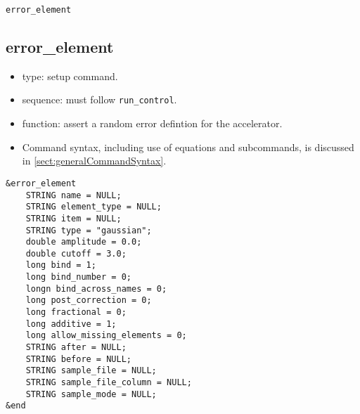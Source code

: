 \documentclass[11pt]{article}
\begin{document}
\newpage
\begin{center}{\Large\verb|error_element|}\end{center}
\subsection{error\_element \label{subsec:errorelement}}

\begin{itemize}
\item type: setup command.
\item sequence: must follow \verb|run_control|.
\item function: assert a random error defintion for the accelerator.
\item Command syntax, including use of equations and subcommands, is discussed in \ref{sect:generalCommandSyntax}.
\end{itemize}

\begin{verbatim}
&error_element
    STRING name = NULL;
    STRING element_type = NULL;
    STRING item = NULL;
    STRING type = "gaussian";
    double amplitude = 0.0;
    double cutoff = 3.0;
    long bind = 1;
    long bind_number = 0;
    longn bind_across_names = 0;
    long post_correction = 0;
    long fractional = 0;
    long additive = 1;
    long allow_missing_elements = 0;
    STRING after = NULL;
    STRING before = NULL;
    STRING sample_file = NULL;
    STRING sample_file_column = NULL;
    STRING sample_mode = NULL;
&end
\end{verbatim}
\end{document}
